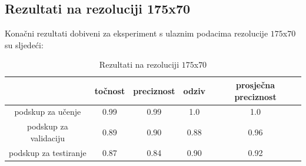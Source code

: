 \documentclass[times, utf8, diplomski, numeric]{fer}
\begin{document}
\subsection{Rezultati na rezoluciji 175x70}
Konačni rezultati dobiveni za eksperiment s ulaznim podacima rezolucije $175$x$70$ su sljedeći:
\begin{table}[H]
\centering
\caption{Rezultati na rezoluciji $175$x$70$}
\label{score:single_hand_175x70}
\begin{tabular}{c|c|c|c|c|}
\cline{2-5}
                                            & točnost & preciznost & odziv & prosječna preciznost \\ \hline
\multicolumn{1}{|c|}{podskup za učenje}     & 0.99       & 0.99        & 1.0     &           1.0           \\ \hline
\multicolumn{1}{|c|}{podskup za validaciju} & 0.89       & 0.90        & 0.88     &            0.96          \\ \hline
\multicolumn{1}{|c|}{podskup za testiranje} & 0.87       & 0.84        & 0.90     &            0.92          \\ \hline
\end{tabular}
\end{table}
\end{document}
